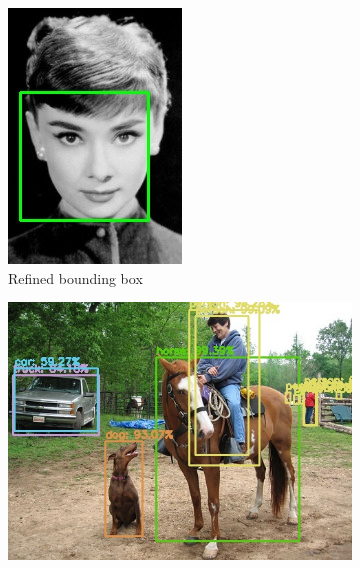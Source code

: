 \begin{figure}[!h]
\begin{subfigure}{.13\linewidth}
		\includegraphics[width=1\linewidth]{images/detection/img1_withNMS}
		\caption{Refined bounding box}
		\label{fig:sub_withNMS}
	\end{subfigure}
	\begin{subfigure}{.35\linewidth}
		\includegraphics[width=1\linewidth]{images/detection/ex2_yolo_noNMS}

\end{subfigure}
\end{figure}
